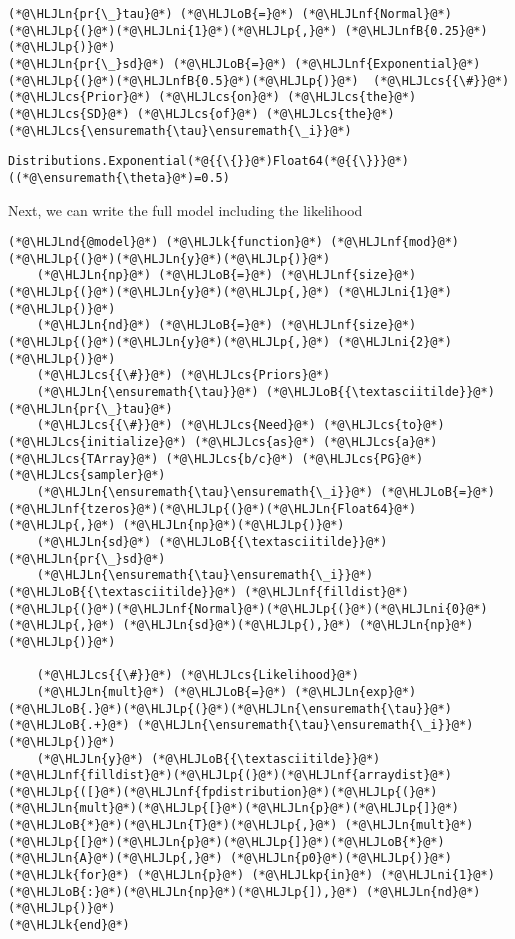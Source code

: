 \documentclass[12pt,a4paper]{article}
\newcommand{\HLJLk}[1]{\textcolor[RGB]{148,91,176}{\textbf{#1}}}
\newcommand{\HLJLkp}[1]{\textcolor[RGB]{148,91,176}{\textbf{#1}}}
\newcommand{\HLJLn}[1]{#1}
\newcommand{\HLJLnd}[1]{\textcolor[RGB]{214,102,97}{#1}}
\newcommand{\HLJLnf}[1]{\textcolor[RGB]{66,102,213}{#1}}
\newcommand{\HLJLnfB}[1]{\textcolor[RGB]{59,151,46}{#1}}
\newcommand{\HLJLni}[1]{\textcolor[RGB]{59,151,46}{#1}}
\newcommand{\HLJLoB}[1]{\textcolor[RGB]{102,102,102}{\textbf{#1}}}
\newcommand{\HLJLp}[1]{#1}
\newcommand{\HLJLcs}[1]{\textcolor[RGB]{153,153,119}{\textit{#1}}}
\begin{document}
\begin{lstlisting}
(*@\HLJLn{pr{\_}tau}@*) (*@\HLJLoB{=}@*) (*@\HLJLnf{Normal}@*)(*@\HLJLp{(}@*)(*@\HLJLni{1}@*)(*@\HLJLp{,}@*) (*@\HLJLnfB{0.25}@*)(*@\HLJLp{)}@*)
(*@\HLJLn{pr{\_}sd}@*) (*@\HLJLoB{=}@*) (*@\HLJLnf{Exponential}@*)(*@\HLJLp{(}@*)(*@\HLJLnfB{0.5}@*)(*@\HLJLp{)}@*)  (*@\HLJLcs{{\#}}@*) (*@\HLJLcs{Prior}@*) (*@\HLJLcs{on}@*) (*@\HLJLcs{the}@*) (*@\HLJLcs{SD}@*) (*@\HLJLcs{of}@*) (*@\HLJLcs{the}@*) (*@\HLJLcs{\ensuremath{\tau}\ensuremath{\_i}}@*)
\end{lstlisting}

\begin{lstlisting}
Distributions.Exponential(*@{{\{}}@*)Float64(*@{{\}}}@*)((*@\ensuremath{\theta}@*)=0.5)
\end{lstlisting}


Next, we can write the full model including the likelihood


\begin{lstlisting}
(*@\HLJLnd{@model}@*) (*@\HLJLk{function}@*) (*@\HLJLnf{mod}@*)(*@\HLJLp{(}@*)(*@\HLJLn{y}@*)(*@\HLJLp{)}@*)
    (*@\HLJLn{np}@*) (*@\HLJLoB{=}@*) (*@\HLJLnf{size}@*)(*@\HLJLp{(}@*)(*@\HLJLn{y}@*)(*@\HLJLp{,}@*) (*@\HLJLni{1}@*)(*@\HLJLp{)}@*)
    (*@\HLJLn{nd}@*) (*@\HLJLoB{=}@*) (*@\HLJLnf{size}@*)(*@\HLJLp{(}@*)(*@\HLJLn{y}@*)(*@\HLJLp{,}@*) (*@\HLJLni{2}@*)(*@\HLJLp{)}@*)
    (*@\HLJLcs{{\#}}@*) (*@\HLJLcs{Priors}@*)
    (*@\HLJLn{\ensuremath{\tau}}@*) (*@\HLJLoB{{\textasciitilde}}@*) (*@\HLJLn{pr{\_}tau}@*)
    (*@\HLJLcs{{\#}}@*) (*@\HLJLcs{Need}@*) (*@\HLJLcs{to}@*) (*@\HLJLcs{initialize}@*) (*@\HLJLcs{as}@*) (*@\HLJLcs{a}@*) (*@\HLJLcs{TArray}@*) (*@\HLJLcs{b/c}@*) (*@\HLJLcs{PG}@*) (*@\HLJLcs{sampler}@*)
    (*@\HLJLn{\ensuremath{\tau}\ensuremath{\_i}}@*) (*@\HLJLoB{=}@*) (*@\HLJLnf{tzeros}@*)(*@\HLJLp{(}@*)(*@\HLJLn{Float64}@*)(*@\HLJLp{,}@*) (*@\HLJLn{np}@*)(*@\HLJLp{)}@*)
    (*@\HLJLn{sd}@*) (*@\HLJLoB{{\textasciitilde}}@*) (*@\HLJLn{pr{\_}sd}@*)
    (*@\HLJLn{\ensuremath{\tau}\ensuremath{\_i}}@*) (*@\HLJLoB{{\textasciitilde}}@*) (*@\HLJLnf{filldist}@*)(*@\HLJLp{(}@*)(*@\HLJLnf{Normal}@*)(*@\HLJLp{(}@*)(*@\HLJLni{0}@*)(*@\HLJLp{,}@*) (*@\HLJLn{sd}@*)(*@\HLJLp{),}@*) (*@\HLJLn{np}@*)(*@\HLJLp{)}@*)

    (*@\HLJLcs{{\#}}@*) (*@\HLJLcs{Likelihood}@*)
    (*@\HLJLn{mult}@*) (*@\HLJLoB{=}@*) (*@\HLJLn{exp}@*)(*@\HLJLoB{.}@*)(*@\HLJLp{(}@*)(*@\HLJLn{\ensuremath{\tau}}@*) (*@\HLJLoB{.+}@*) (*@\HLJLn{\ensuremath{\tau}\ensuremath{\_i}}@*)(*@\HLJLp{)}@*)
    (*@\HLJLn{y}@*) (*@\HLJLoB{{\textasciitilde}}@*) (*@\HLJLnf{filldist}@*)(*@\HLJLp{(}@*)(*@\HLJLnf{arraydist}@*)(*@\HLJLp{([}@*)(*@\HLJLnf{fpdistribution}@*)(*@\HLJLp{(}@*)(*@\HLJLn{mult}@*)(*@\HLJLp{[}@*)(*@\HLJLn{p}@*)(*@\HLJLp{]}@*)(*@\HLJLoB{*}@*)(*@\HLJLn{T}@*)(*@\HLJLp{,}@*) (*@\HLJLn{mult}@*)(*@\HLJLp{[}@*)(*@\HLJLn{p}@*)(*@\HLJLp{]}@*)(*@\HLJLoB{*}@*)(*@\HLJLn{A}@*)(*@\HLJLp{,}@*) (*@\HLJLn{p0}@*)(*@\HLJLp{)}@*) (*@\HLJLk{for}@*) (*@\HLJLn{p}@*) (*@\HLJLkp{in}@*) (*@\HLJLni{1}@*)(*@\HLJLoB{:}@*)(*@\HLJLn{np}@*)(*@\HLJLp{]),}@*) (*@\HLJLn{nd}@*)(*@\HLJLp{)}@*)
(*@\HLJLk{end}@*)
\end{lstlisting}
\end{document}
